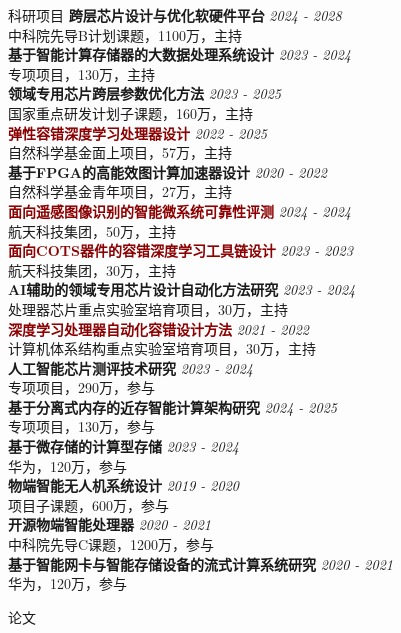 \documentclass{resume} %
\begin{document}
\begin{rSection}{科研项目}
{\bf 跨层芯片设计与优化软硬件平台} \hfill {\em 2024 - 2028} \\ 
中科院先导B计划课题，1100万，主持\\
{\bf 基于智能计算存储器的大数据处理系统设计} \hfill {\em 2023 - 2024} \\
专项项目，130万，主持\\
{\bf 领域专用芯片跨层参数优化方法} \hfill {\em 2023 - 2025} \\
国家重点研发计划子课题，160万，主持\\
{\bf \textcolor{darkred}{弹性容错深度学习处理器设计}} \hfill {\em 2022 - 2025} \\
自然科学基金面上项目，57万，主持 \\
{\bf 基于FPGA的高能效图计算加速器设计} \hfill {\em 2020 - 2022} \\
自然科学基金青年项目，27万，主持 \\
{\bf \textcolor{darkred}{面向遥感图像识别的智能微系统可靠性评测}} \hfill {\em 2024 - 2024} \\ 
航天科技集团，50万，主持\\
{\bf \textcolor{darkred}{面向COTS器件的容错深度学习工具链设计}} \hfill {\em 2023 - 2023} \\
航天科技集团，30万，主持 \\
{\bf AI辅助的领域专用芯片设计自动化方法研究} \hfill {\em 2023 - 2024} \\ 
处理器芯片重点实验室培育项目，30万，主持\\
{\bf \textcolor{darkred}{深度学习处理器自动化容错设计方法}} \hfill {\em 2021 - 2022} \\
计算机体系结构重点实验室培育项目，30万，主持 \\
{\bf 人工智能芯片测评技术研究} \hfill {\em 2023 - 2024} \\
专项项目，290万，参与 \\
{\bf 基于分离式内存的近存智能计算架构研究} \hfill {\em 2024 - 2025} \\
专项项目，130万，参与 \\
{\bf 基于微存储的计算型存储} \hfill {\em 2023 - 2024} \\
华为，120万，参与 \\
{\bf 物端智能无人机系统设计} \hfill {\em 2019 - 2020} \\
项目子课题，600万，参与 \\
{\bf 开源物端智能处理器} \hfill {\em 2020 - 2021} \\
中科院先导C课题，1200万，参与 \\
{\bf 基于智能网卡与智能存储设备的流式计算系统研究} \hfill {\em 2020 - 2021} \\
华为，120万，参与 \\
\end{rSection}

\begin{rSection}{论文}
\end{rSection}
\nocite{*}  %
\printbibliography[heading=none]
\end{document}
